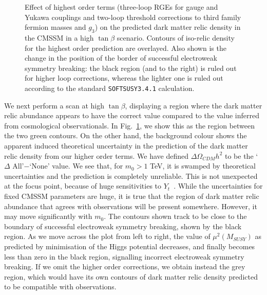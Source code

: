 \documentclass[final,3p,times,pdflatex]{elsarticle}
\begin{document}
\begin{figure}
\begin{center}
\begin{picture}
\end{picture}
\end{center}
\caption{\label{fig:dm} Effect of highest order terms (three-loop
  RGEs for gauge and Yukawa couplings and two-loop threshold corrections to
  third family fermion masses and $g_3$) on the predicted dark matter relic
  density in the CMSSM in a high $\tan \beta$ scenario. Contours of iso-relic
  density for the highest order prediction are overlayed. Also shown is the
  change in the position of the border of successful electroweak symmetry
  breaking: the black region 
  (and to the right) is ruled out for higher loop corrections, whereas
  the lighter one is ruled out according to the standard {\tt SOFTSUSY3.4.1}
  calculation.} 
\end{figure}
We next perform a scan at high $\tan \beta$, displaying a region where the
dark matter relic abundance appears to have the correct value compared to the
value inferred from
cosmological observationals. 
In Fig.~\ref{fig:dm}, we show this as the region between the two green
contours. On the other hand, the background colour shows the apparent induced 
theoretical uncertainty in the prediction of the dark matter relic density
from our higher order terms. We have defined
$\Delta \Omega_{CDM} h^2$ to be the `$\Delta$ All'$-$`None' value. 
We see that, for $m_0>1$ TeV, it is swamped by theoretical uncertainties and
the prediction is completely unreliable. This is not unexpected at the focus
point, because of huge sensitivities to $Y_t$~\cite{Allanach:2012qd}. While
the uncertainties for 
fixed CMSSM parameters are huge, it is true that the region of dark
matter relic abundance that agrees with observations will be present
somewhere. However, it may move significantly with $m_0$. The contours shown
track to be close to the boundary of successful electroweak symmetry breaking,
shown by the black region. As we move across the plot from
left to right, the value of $\mu^2(M_{SUSY})$ as predicted by minimisation of
the Higgs potential decreases, and finally becomes less than zero in the black
region, signalling incorrect electroweak symmetry breaking. 
If we omit the
higher order corrections, we obtain instead the grey region, which would have
its own contours of dark matter relic density predicted to be compatible with
observations. 
\end{document}
